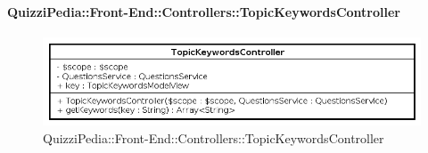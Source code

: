 \paragraph{QuizziPedia::Front-End::Controllers::TopicKeywordsController}
\begin{figure} [ht]
	\centering
	\includegraphics[scale=0.8]{UML/Classi/Front-End/QuizziPedia_Front-end_Controller_TopicKeywordsController.png}
	\caption{QuizziPedia::Front-End::Controllers::TopicKeywordsController}
\end{figure} \FloatBarrier
